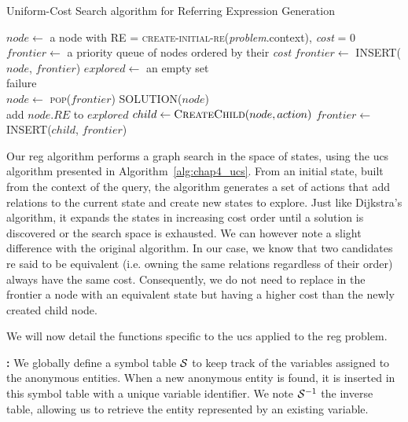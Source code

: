 \begin{algorithm}[ht!]
\caption{Uniform-Cost Search algorithm for Referring Expression Generation}
\label{alg:chap4_ucs}
\begin{algorithmic}
    \State $node\leftarrow$ a node with RE = \textsc{create-initial-re}(\textit{problem}.context), \textit{cost} = 0
    \State $frontier\leftarrow$ a priority queue of nodes ordered by their \textit{cost}
    \State $frontier\leftarrow$ \textsc{INSERT}($node$, $frontier$)
    \State $explored\leftarrow$ an empty set
    \\
    \Loop
        	\State \Return failure
        \EndIf
        \\
        \State $node\leftarrow$ \textsc{pop}($frontier$)
        	\State \Return \textsc{SOLUTION}($node$)
        \EndIf
        \\
        \State add $node.RE$ to $explored$
            \State $child \leftarrow \textsc{CreateChild}(node, action)$
            	\State $frontier\leftarrow$ \textsc{INSERT}($child$, $frontier$)
            \EndIf
        \EndFor
    \EndLoop
\EndFunction
\end{algorithmic}
\end{algorithm}

Our \acrshort{reg} algorithm performs a graph search in the space of states, using the \acrlong{ucs} algorithm presented in Algorithm~\ref{alg:chap4_ucs}.
From an initial state, built from the context of the query, the algorithm generates a set of actions that add relations to the current state and create new states to explore. Just like Dijkstra's algorithm, it expands the states in increasing cost order until a solution is discovered or the search space is exhausted. We can however note a slight difference with the original algorithm. In our case, we know that two candidates \acrshort{re} said to be equivalent (i.e. owning the same relations regardless of their order) always have the same cost. Consequently, we do not need to replace in the frontier a node with an equivalent state but having a higher cost than the newly created child node.

We will now detail the functions specific to the \acrshort{ucs} applied to the \acrshort{reg} problem.

\textbf{\tovariable: }
We globally define a symbol table $\mathcal{S}$ to keep track of the variables assigned to the anonymous entities. When a new anonymous entity is found, it is inserted in this symbol table with a unique variable identifier. We note $\mathcal{S}^{-1}$ the inverse table, allowing us to retrieve the entity represented by an existing variable.

